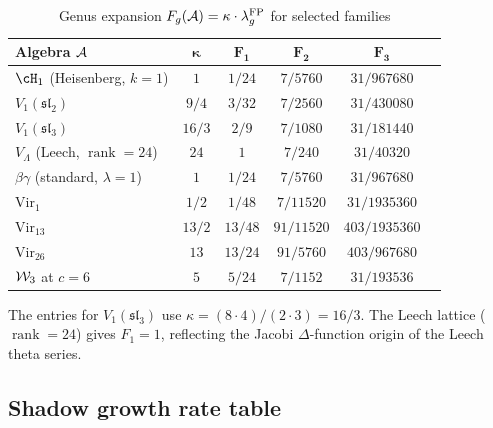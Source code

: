 \begin{table}[ht]
\centering
\caption{Genus expansion $F_g(\mathcal{A}) = \kappa \cdot \lambda_g^{\mathrm{FP}}$
for selected families}
\label{tab:genus-expansion}
\renewcommand{\arraystretch}{1.35}
{\small
\begin{tabular}{lccccc}
\toprule
\textbf{Algebra $\mathcal{A}$}
 & $\boldsymbol{\kappa}$
 & $\boldsymbol{F_1}$
 & $\boldsymbol{F_2}$
 & $\boldsymbol{F_3}$ \\
\midrule
$\cH_1$ (Heisenberg, $k{=}1$)
 & $1$ & $1/24$ & $7/5760$ & $31/967680$ \\
$V_1(\mathfrak{sl}_2)$
 & $9/4$ & $3/32$ & $7/2560$ & $31/430080$ \\
$V_1(\mathfrak{sl}_3)$
 & $16/3$ & $2/9$ & $7/1080$ & $31/181440$ \\
$V_\Lambda$ (Leech, $\operatorname{rank}{=}24$)
 & $24$ & $1$ & $7/240$ & $31/40320$ \\
$\beta\gamma$ (standard, $\lambda{=}1$)
 & $1$ & $1/24$ & $7/5760$ & $31/967680$ \\
$\mathrm{Vir}_1$
 & $1/2$ & $1/48$ & $7/11520$ & $31/1935360$ \\
$\mathrm{Vir}_{13}$
 & $13/2$ & $13/48$ & $91/11520$ & $403/1935360$ \\
$\mathrm{Vir}_{26}$
 & $13$ & $13/24$ & $91/5760$ & $403/967680$ \\
$\mathcal{W}_3$ at $c{=}6$
 & $5$ & $5/24$ & $7/1152$ & $31/193536$ \\
\bottomrule
\end{tabular}
}
\end{table}

\noindent
The entries for $V_1(\mathfrak{sl}_3)$ use
$\kappa = (8 \cdot 4)/(2 \cdot 3) = 16/3$. The Leech lattice
($\operatorname{rank} = 24$) gives $F_1 = 1$, reflecting the
Jacobi $\Delta$-function origin of the Leech theta series.

\subsection{Shadow growth rate table}\label{ssec:growth-rate-table}


